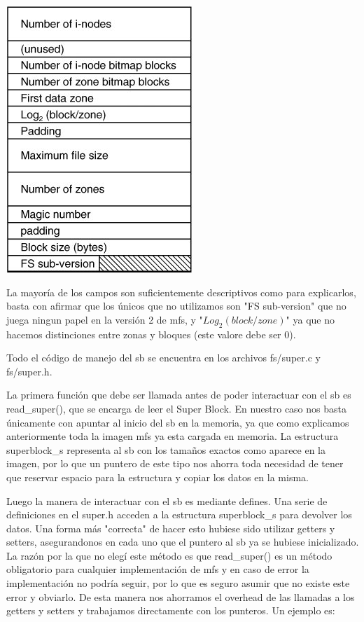 \begin{center}
\includegraphics[scale=0.7]{../img/superblock.png}
\end{center}

La mayoría de los campos son suficientemente descriptivos como para explicarlos,
basta con afirmar que los únicos que no utilizamos son "FS sub-version" que no
juega ningun papel en la versión 2 de mfs, y "$Log_2 (block/zone)$" ya que no
hacemos distinciones entre zonas y bloques (este valore debe ser 0).

Todo el código de manejo del sb se encuentra en los archivos fs/super.c y
fs/super.h.

La primera función que debe ser llamada antes de poder interactuar con el sb es
read\_super(), que se encarga de leer el Super Block. En nuestro caso nos basta
únicamente con apuntar al inicio del sb en la memoria, ya que como explicamos
anteriormente toda la imagen mfs ya esta cargada en memoria. La estructura
superblock\_s representa al sb con los tamaños exactos como aparece en la
imagen, por lo que un puntero de este tipo nos ahorra toda necesidad de tener
que reservar espacio para la estructura y copiar los datos en la misma.

Luego la manera de interactuar con el sb es mediante defines. Una serie de
definiciones en el super.h acceden a la estructura superblock\_s para devolver
los datos. Una forma más "correcta" de hacer esto hubiese sido utilizar getters
y setters, asegurandonos en cada uno que el puntero al sb ya se hubiese
inicializado. La razón por la que no elegí este método es que read\_super() es
un método obligatorio para cualquier implementación de mfs y en caso de error la
implementación no podría seguir, por lo que es seguro asumir que no existe este
error y obviarlo. De esta manera nos ahorramos el overhead de las llamadas a los
getters y setters y trabajamos directamente con los punteros. Un ejemplo es:

